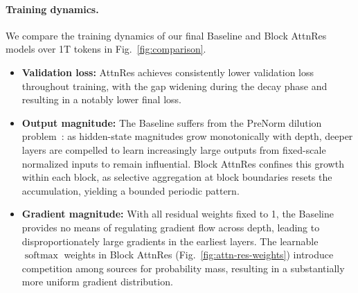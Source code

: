\paragraph{Training dynamics.}
We compare the training dynamics of our final Baseline and Block AttnRes models over 1T tokens in Fig.~\ref{fig:comparison}.
\begin{itemize}[leftmargin=*]
    \item \textbf{Validation loss:} AttnRes achieves consistently lower validation loss throughout training, with the gap widening during the decay phase and resulting in a notably lower final loss.
    \item \textbf{Output magnitude:} The Baseline suffers from the PreNorm dilution problem~\citep{xiong2020layer,li2026siamesenorm}: as hidden-state magnitudes grow monotonically with depth, deeper layers are compelled to learn increasingly large outputs from fixed-scale normalized inputs to remain influential. Block AttnRes confines this growth within each block, as selective aggregation at block boundaries resets the accumulation, yielding a bounded periodic pattern.
    \item \textbf{Gradient magnitude:} With all residual weights fixed to 1, the Baseline provides no means of regulating gradient flow across depth, leading to disproportionately large gradients in the earliest layers. The learnable $\operatorname{softmax}$ weights in Block AttnRes (Fig.~\ref{fig:attn-res-weights}) introduce competition among sources for probability mass, resulting in a substantially more uniform gradient distribution.
\end{itemize}

